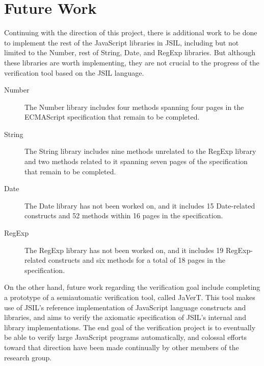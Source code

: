 \documentclass[a4paper,11pt,twoside]{report}
\begin{document}
\section{Future Work}
Continuing with the direction of this project, there is additional work to be done to implement the rest of the JavaScript libraries in JSIL, including but not limited to the Number, rest of String, Date, and RegExp libraries. But although these libraries are worth implementing, they are not crucial to the progress of the verification tool based on the JSIL language.

\begin{description}
\item[Number] The Number library includes four methods spanning four pages in the ECMAScript specification that remain to be completed. 
\item[String] The String library includes nine methods unrelated to the RegExp library and two methods related to it spanning seven pages of the specification that remain to be completed.
\item[Date] The Date library has not been worked on, and it includes 15 Date-related constructs and 52 methods within 16 pages in the specification.
\item[RegExp] The RegExp library has not been worked on, and it includes 19 RegExp-related constructs and six methods for a total of 18 pages in the specification.
\end{description}

On the other hand, future work regarding the verification goal include completing a prototype of a semiautomatic verification tool, called JaVerT. This tool makes use of JSIL's reference implementation of JavaScript language constructs and libraries, and aims to verify the axiomatic specification of JSIL's internal and library implementations. The end goal of the verification project is to eventually be able to verify large JavaScript programs automatically, and colossal efforts toward that direction have been made continually by other members of the research group.



\end{document}
